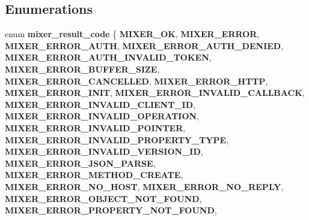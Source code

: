 \subsection*{Enumerations}
\begin{DoxyCompactItemize}
\item 
\mbox{\label{group__interactivity_ga174546a7b8b4e14a1f28ff39e6bac482}} 
enum {\bfseries mixer\+\_\+result\+\_\+code} \{ \newline
{\bfseries M\+I\+X\+E\+R\+\_\+\+OK}, 
{\bfseries M\+I\+X\+E\+R\+\_\+\+E\+R\+R\+OR}, 
{\bfseries M\+I\+X\+E\+R\+\_\+\+E\+R\+R\+O\+R\+\_\+\+A\+U\+TH}, 
{\bfseries M\+I\+X\+E\+R\+\_\+\+E\+R\+R\+O\+R\+\_\+\+A\+U\+T\+H\+\_\+\+D\+E\+N\+I\+ED}, 
\newline
{\bfseries M\+I\+X\+E\+R\+\_\+\+E\+R\+R\+O\+R\+\_\+\+A\+U\+T\+H\+\_\+\+I\+N\+V\+A\+L\+I\+D\+\_\+\+T\+O\+K\+EN}, 
{\bfseries M\+I\+X\+E\+R\+\_\+\+E\+R\+R\+O\+R\+\_\+\+B\+U\+F\+F\+E\+R\+\_\+\+S\+I\+ZE}, 
{\bfseries M\+I\+X\+E\+R\+\_\+\+E\+R\+R\+O\+R\+\_\+\+C\+A\+N\+C\+E\+L\+L\+ED}, 
{\bfseries M\+I\+X\+E\+R\+\_\+\+E\+R\+R\+O\+R\+\_\+\+H\+T\+TP}, 
\newline
{\bfseries M\+I\+X\+E\+R\+\_\+\+E\+R\+R\+O\+R\+\_\+\+I\+N\+IT}, 
{\bfseries M\+I\+X\+E\+R\+\_\+\+E\+R\+R\+O\+R\+\_\+\+I\+N\+V\+A\+L\+I\+D\+\_\+\+C\+A\+L\+L\+B\+A\+CK}, 
{\bfseries M\+I\+X\+E\+R\+\_\+\+E\+R\+R\+O\+R\+\_\+\+I\+N\+V\+A\+L\+I\+D\+\_\+\+C\+L\+I\+E\+N\+T\+\_\+\+ID}, 
{\bfseries M\+I\+X\+E\+R\+\_\+\+E\+R\+R\+O\+R\+\_\+\+I\+N\+V\+A\+L\+I\+D\+\_\+\+O\+P\+E\+R\+A\+T\+I\+ON}, 
\newline
{\bfseries M\+I\+X\+E\+R\+\_\+\+E\+R\+R\+O\+R\+\_\+\+I\+N\+V\+A\+L\+I\+D\+\_\+\+P\+O\+I\+N\+T\+ER}, 
{\bfseries M\+I\+X\+E\+R\+\_\+\+E\+R\+R\+O\+R\+\_\+\+I\+N\+V\+A\+L\+I\+D\+\_\+\+P\+R\+O\+P\+E\+R\+T\+Y\+\_\+\+T\+Y\+PE}, 
{\bfseries M\+I\+X\+E\+R\+\_\+\+E\+R\+R\+O\+R\+\_\+\+I\+N\+V\+A\+L\+I\+D\+\_\+\+V\+E\+R\+S\+I\+O\+N\+\_\+\+ID}, 
{\bfseries M\+I\+X\+E\+R\+\_\+\+E\+R\+R\+O\+R\+\_\+\+J\+S\+O\+N\+\_\+\+P\+A\+R\+SE}, 
\newline
{\bfseries M\+I\+X\+E\+R\+\_\+\+E\+R\+R\+O\+R\+\_\+\+M\+E\+T\+H\+O\+D\+\_\+\+C\+R\+E\+A\+TE}, 
{\bfseries M\+I\+X\+E\+R\+\_\+\+E\+R\+R\+O\+R\+\_\+\+N\+O\+\_\+\+H\+O\+ST}, 
{\bfseries M\+I\+X\+E\+R\+\_\+\+E\+R\+R\+O\+R\+\_\+\+N\+O\+\_\+\+R\+E\+P\+LY}, 
{\bfseries M\+I\+X\+E\+R\+\_\+\+E\+R\+R\+O\+R\+\_\+\+O\+B\+J\+E\+C\+T\+\_\+\+N\+O\+T\+\_\+\+F\+O\+U\+ND}, 
\newline
{\bfseries M\+I\+X\+E\+R\+\_\+\+E\+R\+R\+O\+R\+\_\+\+P\+R\+O\+P\+E\+R\+T\+Y\+\_\+\+N\+O\+T\+\_\+\+F\+O\+U\+ND}, 

\end{DoxyCompactItemize}
